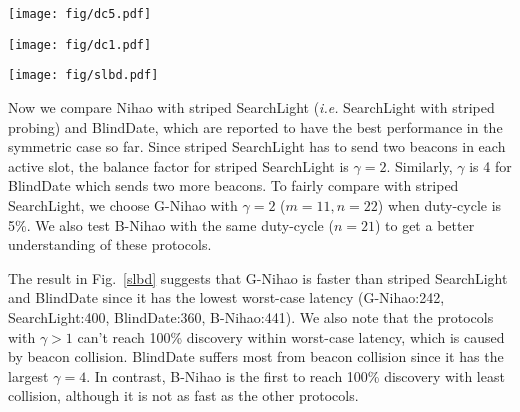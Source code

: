 \documentclass[conference]{IEEEtran}
\begin{document}
\begin{figure*}[t]
    \centering
    \begin{minipage}[t]{0.3\textwidth}
    \centering
    \texttt{[image: fig/dc5.pdf]}
    \caption{CDFs of discovery latency with duty-cycle 5\%.}\label{dc5}
    \end{minipage}
    \hspace{1em}
    \begin{minipage}[t]{0.3\textwidth}
    \centering
    \texttt{[image: fig/dc1.pdf]}
    \caption{CDFs of discovery latency with duty-cycle 1\%.}\label{dc1}
    \end{minipage}
    \hspace{1em}
    \begin{minipage}[t]{0.3\textwidth}
    \centering
    \texttt{[image: fig/slbd.pdf]}
    \caption{Compare Nihao with striped SearchLight and BlindDate at the duty-cycle of 5\%.}\label{slbd}
    \end{minipage}
\end{figure*}

Now we compare Nihao with striped SearchLight (\emph{i.e.} SearchLight with striped probing) and BlindDate, which are reported to have the best performance in the symmetric case so far.
Since striped SearchLight has to send two beacons in each active slot, the balance factor for striped SearchLight is $\gamma=2$.
Similarly, $\gamma$ is 4 for BlindDate which sends two more beacons.
To fairly compare with striped SearchLight, we choose G-Nihao with $\gamma=2$ ($m=11, n=22$) when duty-cycle is 5\%.
We also test B-Nihao with the same duty-cycle ($n=21$) to get a better understanding of these protocols.

The result in Fig.~\ref{slbd} suggests that G-Nihao is faster than striped SearchLight and BlindDate since it has the lowest worst-case latency (G-Nihao:242, SearchLight:400, BlindDate:360, B-Nihao:441).
We also note that the protocols with $\gamma > 1$ can't reach 100\% discovery within worst-case latency, which is caused by beacon collision.
BlindDate suffers most from beacon collision since it has the largest $\gamma=4$.
In contrast, B-Nihao is the first to reach 100\% discovery with least collision, although it is not as fast as the other protocols.
\end{document}
